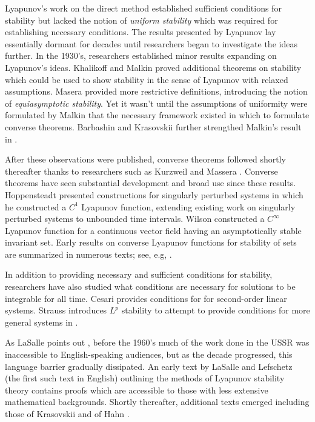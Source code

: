 Lyapunov's work on the direct method established sufficient conditions for
stability but lacked the notion of {\em uniform stability} which was required
for establishing necessary conditions.
%
The results presented by Lyapunov lay essentially dormant for decades until
researchers began to investigate the ideas further.
%
In the 1930's, researchers established minor results expanding on Lyapunov's
ideas.
%
Khalikoff \cite{Khalikoff1937} and Malkin \cite{Malkin1938} proved additional
theorems on stability which could be used to show stability in the sense of
Lyapunov with relaxed assumptions.
%
Masera \cite{Massera1949} provided more restrictive definitions, introducing the
notion of {\em equiasymptotic  stability}.
%
Yet it wasn't until the assumptions of uniformity were formulated by Malkin
\cite{Malkin1954} that the necessary framework existed in which to formulate
converse theorems.
%
Barbashin and Krasovskii further strengthed Malkin's result in \cite{Barbashin1954}.
%

After these observations were published, converse theorems followed shortly
thereafter thanks to researchers such as Kurzweil \cite{Kurzweil1956} and
Massera \cite{Massera1956}.
%
Converse theorems have seen substantial development and broad use since these results.
%
Hoppensteadt \cite{Hoppensteadt1966} presented constructions for singularly
perturbed systems in which he constructed a $C^{1}$ Lyapunov function, extending
existing work on singularly perturbed systems to unbounded time intervals.
%
Wilson \cite{Wilson1969} constructed a $C^{\infty}$ Lyapunov function for a
continuous vector field having an asymptotically stable invariant set.
%
Early results on converse Lyapunov functions for stability of sets are
summarized in numerous texts; see, e.g, \cite{Antosiewicz1958,Yoshizawa1975}.

In addition to providing necessary and sufficient conditions for stability,
researchers have also studied what conditions are necessary for solutions to be
integrable for all time.
%
Cesari provides conditions  for \cite[\S 1.5]{Cesari1971} for second-order
linear systems.
%
Strauss introduces $L^{p}$ stability to attempt to provide conditions for more
general systems in \cite{Strauss1965}.

As LaSalle points out \cite{LaSalle1964}, before the 1960's much of the work
done in the USSR was inaccessible to English-speaking audiences, but as the
decade progressed, this language barrier gradually dissipated.
%
An early text by LaSalle and Lefschetz (the first such text in English)
\cite{LaSalle1961} outlining the methods of Lyapunov stability theory contains
proofs which are accessible to those with less extensive mathematical
backgrounds.
%
Shortly thereafter, additional texts emerged including those of Krasovskii
\cite{Krasovskii1963} and of Hahn \cite{Hahn1967}.

